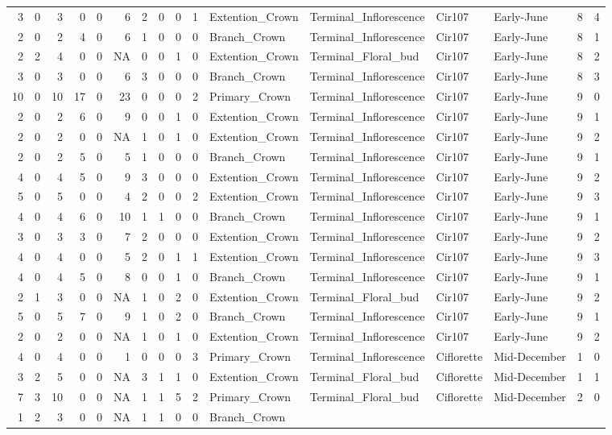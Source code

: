 \documentclass[]{article}
\begin{document}
\begin{longtable}[]{@{}rrrrrrrrrrllllrl@{}}
3 & 0 & 3 & 0 & 0 & 6 & 2 & 0 & 0 & 1 & Extention\_Crown &
Terminal\_Inflorescence & Cir107 & Early-June & 8 & 4\tabularnewline
2 & 0 & 2 & 4 & 0 & 6 & 1 & 0 & 0 & 0 & Branch\_Crown &
Terminal\_Inflorescence & Cir107 & Early-June & 8 & 1\tabularnewline
2 & 2 & 4 & 0 & 0 & NA & 0 & 0 & 1 & 0 & Extention\_Crown &
Terminal\_Floral\_bud & Cir107 & Early-June & 8 & 2\tabularnewline
3 & 0 & 3 & 0 & 0 & 6 & 3 & 0 & 0 & 0 & Branch\_Crown &
Terminal\_Inflorescence & Cir107 & Early-June & 8 & 3\tabularnewline
10 & 0 & 10 & 17 & 0 & 23 & 0 & 0 & 0 & 2 & Primary\_Crown &
Terminal\_Inflorescence & Cir107 & Early-June & 9 & 0\tabularnewline
2 & 0 & 2 & 6 & 0 & 9 & 0 & 0 & 1 & 0 & Extention\_Crown &
Terminal\_Inflorescence & Cir107 & Early-June & 9 & 1\tabularnewline
2 & 0 & 2 & 0 & 0 & NA & 1 & 0 & 1 & 0 & Extention\_Crown &
Terminal\_Inflorescence & Cir107 & Early-June & 9 & 2\tabularnewline
2 & 0 & 2 & 5 & 0 & 5 & 1 & 0 & 0 & 0 & Branch\_Crown &
Terminal\_Inflorescence & Cir107 & Early-June & 9 & 1\tabularnewline
4 & 0 & 4 & 5 & 0 & 9 & 3 & 0 & 0 & 0 & Extention\_Crown &
Terminal\_Inflorescence & Cir107 & Early-June & 9 & 2\tabularnewline
5 & 0 & 5 & 0 & 0 & 4 & 2 & 0 & 0 & 2 & Extention\_Crown &
Terminal\_Inflorescence & Cir107 & Early-June & 9 & 3\tabularnewline
4 & 0 & 4 & 6 & 0 & 10 & 1 & 1 & 0 & 0 & Branch\_Crown &
Terminal\_Inflorescence & Cir107 & Early-June & 9 & 1\tabularnewline
3 & 0 & 3 & 3 & 0 & 7 & 2 & 0 & 0 & 0 & Extention\_Crown &
Terminal\_Inflorescence & Cir107 & Early-June & 9 & 2\tabularnewline
4 & 0 & 4 & 0 & 0 & 5 & 2 & 0 & 1 & 1 & Extention\_Crown &
Terminal\_Inflorescence & Cir107 & Early-June & 9 & 3\tabularnewline
4 & 0 & 4 & 5 & 0 & 8 & 0 & 0 & 1 & 0 & Branch\_Crown &
Terminal\_Inflorescence & Cir107 & Early-June & 9 & 1\tabularnewline
2 & 1 & 3 & 0 & 0 & NA & 1 & 0 & 2 & 0 & Extention\_Crown &
Terminal\_Floral\_bud & Cir107 & Early-June & 9 & 2\tabularnewline
5 & 0 & 5 & 7 & 0 & 9 & 1 & 0 & 2 & 0 & Branch\_Crown &
Terminal\_Inflorescence & Cir107 & Early-June & 9 & 1\tabularnewline
2 & 0 & 2 & 0 & 0 & NA & 1 & 0 & 1 & 0 & Extention\_Crown &
Terminal\_Inflorescence & Cir107 & Early-June & 9 & 2\tabularnewline
4 & 0 & 4 & 0 & 0 & 1 & 0 & 0 & 0 & 3 & Primary\_Crown &
Terminal\_Inflorescence & Ciflorette & Mid-December & 1 &
0\tabularnewline
3 & 2 & 5 & 0 & 0 & NA & 3 & 1 & 1 & 0 & Extention\_Crown &
Terminal\_Floral\_bud & Ciflorette & Mid-December & 1 & 1\tabularnewline
7 & 3 & 10 & 0 & 0 & NA & 1 & 1 & 5 & 2 & Primary\_Crown &
Terminal\_Floral\_bud & Ciflorette & Mid-December & 2 & 0\tabularnewline
1 & 2 & 3 & 0 & 0 & NA & 1 & 1 & 0 & 0 & Branch\_Crown &

\end{longtable}
\end{document}
